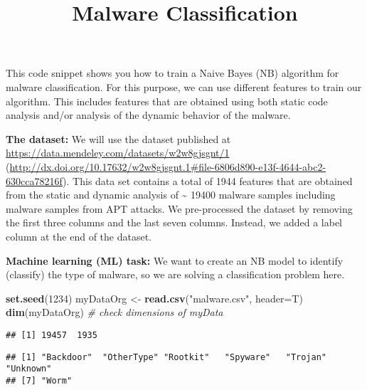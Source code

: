 \documentclass[]{article}
\title{Malware Classification}
\author{}
\date{}
\newenvironment{Shaded}{\begin{snugshade}}{\end{snugshade}}
\newcommand{\CommentTok}[1]{\textcolor[rgb]{0.56,0.35,0.01}{\textit{#1}}}
\newcommand{\DataTypeTok}[1]{\textcolor[rgb]{0.13,0.29,0.53}{#1}}
\newcommand{\DecValTok}[1]{\textcolor[rgb]{0.00,0.00,0.81}{#1}}
\newcommand{\KeywordTok}[1]{\textcolor[rgb]{0.13,0.29,0.53}{\textbf{#1}}}
\newcommand{\NormalTok}[1]{#1}
\newcommand{\OperatorTok}[1]{\textcolor[rgb]{0.81,0.36,0.00}{\textbf{#1}}}
\newcommand{\StringTok}[1]{\textcolor[rgb]{0.31,0.60,0.02}{#1}}
\begin{document}
\maketitle

This code snippet shows you how to train a Naive Bayes (NB) algorithm
for malware classification. For this purpose, we can use different
features to train our algorithm. This includes features that are
obtained using both static code analysis and/or analysis of the dynamic
behavior of the malware.

\textbf{The dataset:} We will use the dataset published at
\url{https://data.mendeley.com/datasets/w2w8gjsgnt/1}
(\url{http://dx.doi.org/10.17632/w2w8gjsgnt.1\#file-6806d890-e13f-4644-abc2-630cca78216f}).
This data set contains a total of 1944 features that are obtained from
the static and dynamic analysis of \textasciitilde{} 19400 malware
samples including malware samples from APT attacks. We pre-processed the
dataset by removing the first three columns and the last seven columns.
Instead, we added a label column at the end of the dataset.

\textbf{Machine learning (ML) task:} We want to create an NB model to
identify (classify) the type of malware, so we are solving a
classification problem here.

\begin{Shaded}
\begin{Highlighting}[]
\KeywordTok{set.seed}\NormalTok{(}\DecValTok{1234}\NormalTok{)}
\NormalTok{myDataOrg <-}\StringTok{ }\KeywordTok{read.csv}\NormalTok{(}\StringTok{"malware.csv"}\NormalTok{, }\DataTypeTok{header=}\NormalTok{T)}
\KeywordTok{dim}\NormalTok{(myDataOrg) }\CommentTok{# check dimensions of myData}
\end{Highlighting}
\end{Shaded}

\begin{verbatim}
## [1] 19457  1935
\end{verbatim}

\begin{Shaded}
\end{Shaded}

\begin{verbatim}
## [1] "Backdoor"  "OtherType" "Rootkit"   "Spyware"   "Trojan"    "Unknown"  
## [7] "Worm"
\end{verbatim}
\end{document}
